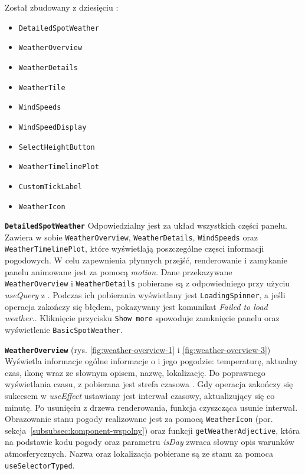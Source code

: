 Został zbudowany z dziesięciu :
\begin{itemize}
    \item \texttt{DetailedSpotWeather}
    \item \texttt{WeatherOverview}
    \item \texttt{WeatherDetails}
    \item \texttt{WeatherTile}
    \item \texttt{WindSpeeds}
    \item \texttt{WindSpeedDisplay}
    \item \texttt{SelectHeightButton}
    \item \texttt{WeatherTimelinePlot}
    \item \texttt{CustomTickLabel}
    \item \texttt{WeatherIcon}
\end{itemize}



\textbf{\texttt{DetailedSpotWeather}}
Odpowiedzialny jest za układ wszystkich części panelu.
Zawiera w sobie  \texttt{WeatherOverview}, \texttt{WeatherDetails}, \texttt{WindSpeeds}
oraz \texttt{WeatherTimelinePlot}, które wyświetlają poszczególne częsci informacji pogodowych.
W celu zapewnienia płynnych przejść, renderowanie i zamykanie panelu animowane jest za pomocą  \emph{motion}.
Dane przekazywane \\  \texttt{WeatherOverview} i \texttt{WeatherDetails} pobierane są z
odpowiedniego   przy użyciu  \emph{useQuery}
z .
Podczas ich pobierania wyświetlany jest \texttt{LoadingSpinner}, a jeśli operacja zakończy się błędem, pokazywany jest
komunikat \emph{Failed to load weather.}.
Kliknięcie przycisku \texttt{Show more} spowoduje zamknięcie panelu oraz wyświetlenie  \texttt{BasicSpotWeather}.


\textbf{\texttt{WeatherOverview}} (rys. \ref{fig:weather-overview-1} i \ref{fig:weather-overview-3})
Wyświetla informacje ogólne informacje o  i jego pogodzie: temperaturę, aktualny czas,
ikonę wraz ze słownym opisem, nazwę, lokalizację.
Do poprawnego wyświetlania czasu, z  pobierana jest strefa czasowa .
Gdy operacja zakończy się sukcesem w  \emph{useEffect} ustawiany jest interwał czasowy, aktualizujący
się co minutę.
Po usunięciu  z drzewa renderowania, funkcja czyszcząca usunie interwał.
Obrazowanie stanu pogody realizowane jest za pomocą \texttt{WeatherIcon} (por. sekcja~\ref{subsubsec:komponent-wspolny})
oraz funkcji \texttt{getWeatherAdjective}, która na podstawie kodu pogody oraz parametru \emph{isDay} zwraca słowny
opis warunków atmosferycznych.
Nazwa oraz lokalizacja  pobierane są ze stanu  za pomoca
 \texttt{useSelectorTyped}.


